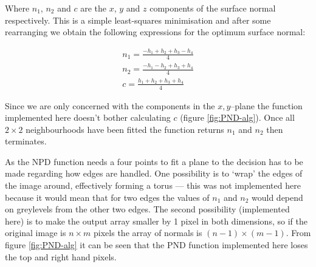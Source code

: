\documentclass[11pt,a4paper]{article}
\begin{document}
\begin{multicols}{2}
		Where $n_1$, $n_2$ and $c$ are the $x$, $y$ and $z$ components of the surface normal respectively. This is a simple least-squares minimisation and after some rearranging we obtain the following expressions for the optimum surface normal:

		\begin{equation}
		\begin{split}
			n_1 = \frac{-h_1 + h_2 + h_3 - h_4}{4} \\
			n_2 = \frac{-h_1 - h_2 + h_3 + h_4}{4} \\
			c = \frac{h_1 + h_2 + h_3 + h_4}{4}
		\end{split}
		\end{equation}

		Since we are only concerned with the components in the $x,y$--plane the function implemented here doesn't bother calculating $c$ (figure \ref{fig:PND-alg}). Once all $2 \times 2$ neighbourhoods have been fitted the function returns $n_1$ and $n_2$ then terminates.

		As the NPD function needs a four points to fit a plane to the decision has to be made regarding how edges are handled. One possibility is to `wrap' the edges of the image around, effectively forming a torus --- this was not implemented here because it would mean that for two edges the values of $n_1$ and $n_2$ would depend on greylevels from the other two edges. The second possibility (implemented here) is to make the output array smaller by 1 pixel in both dimensions, so if the original image is $n \times m$ pixels the array of normals is $(n-1) \times (m-1)$. From figure \ref{fig:PND-alg} it can be seen that the PND function implemented here loses the top and right hand pixels.


\end{multicols}
\end{document}
